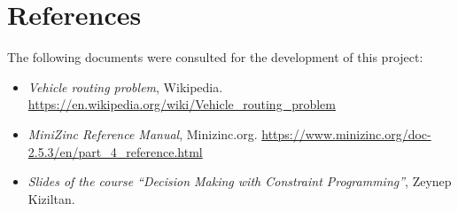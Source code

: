 \documentclass[main.tex]{subfiles}
\begin{document}
\section{References}

The following documents were consulted for the development of this project:
\begin{itemize}
    \item \textit{Vehicle routing problem}, Wikipedia. \href{https://en.wikipedia.org/wiki/Vehicle_routing_problem}{https://en.wikipedia.org/wiki/Vehicle\_routing\_problem}
    \item \textit{MiniZinc Reference Manual}, Minizinc.org. \href{https://www.minizinc.org/doc-2.5.3/en/part_4_reference.html}{https://www.minizinc.org/doc-2.5.3/en/part\_4\_reference.html}
    \item \textit{Slides of the course ``Decision Making with Constraint Programming''}, Zeynep Kiziltan.
\end{itemize}
\end{document}

